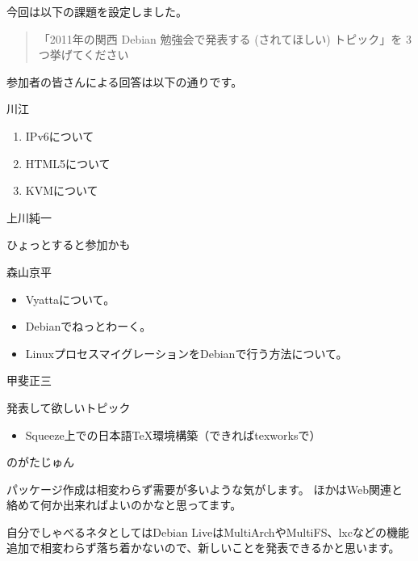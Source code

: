 \documentclass[mingoth,a4paper]{jsarticle}
\begin{document}

今回は以下の課題を設定しました。
%
\begin{quote}
    \begin{screen}
「2011年の関西 Debian 勉強会で発表する (されてほしい) トピック」を 3 つ挙げてください
    \end{screen}
\end{quote}
%
参加者の皆さんによる回答は以下の通りです。

\begin{prework}{ 川江 }

 \begin{enumerate}
  \item IPv6について
  \item HTML5について
  \item KVMについて
 \end{enumerate}

\end{prework}


\begin{prework}{ 上川純一 }

ひょっとすると参加かも

\end{prework}


\begin{prework}{ 森山京平 }

\begin{itemize}
 \item Vyattaについて。
 \item Debianでねっとわーく。
 \item LinuxプロセスマイグレーションをDebianで行う方法について。
\end{itemize}

\end{prework}


\begin{prework}{ 甲斐正三 }

発表して欲しいトピック

 \begin{itemize}
  \item Squeeze上での日本語TeX環境構築（できればtexworksで）
 \end{itemize}

\end{prework}


\begin{prework}{ のがたじゅん }

パッケージ作成は相変わらず需要が多いような気がします。
ほかはWeb関連と絡めて何か出来ればよいのかなと思ってます。

自分でしゃべるネタとしてはDebian LiveはMultiArchやMultiFS、lxcなどの機能
追加で相変わらず落ち着かないので、新しいことを発表できるかと思います。

\end{prework}
\end{document}
